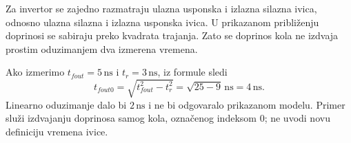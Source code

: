 Za invertor se zajedno razmatraju ulazna usponska i izlazna silazna ivica, odnosno ulazna silazna i izlazna usponska ivica. U prikazanom približenju doprinosi se sabiraju preko kvadrata trajanja. Zato se doprinos kola ne izdvaja prostim oduzimanjem dva izmerena vremena.

Ako izmerimo $t_{fout}=5\,\mathrm{ns}$ i $t_r=3\,\mathrm{ns}$, iz formule sledi
\[t_{fout0}=\sqrt{t_{fout}^{2}-t_r^{2}}=\sqrt{25-9}\,\mathrm{ns}=4\,\mathrm{ns}.\]
Linearno oduzimanje dalo bi $2\,\mathrm{ns}$ i ne bi odgovaralo prikazanom modelu. Primer služi izdvajanju doprinosa samog kola, označenog indeksom 0; ne uvodi novu definiciju vremena ivice.
